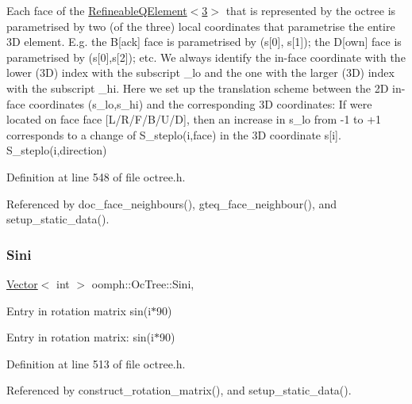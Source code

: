 Each face of the \hyperlink{classoomph_1_1RefineableQElement_3_013_01_4}{Refineable\+Q\+Element$<$3$>$} that is represented by the octree is parametrised by two (of the three) local coordinates that parametrise the entire 3D element. E.\+g. the B\mbox{[}ack\mbox{]} face is parametrised by (s\mbox{[}0\mbox{]}, s\mbox{[}1\mbox{]}); the D\mbox{[}own\mbox{]} face is parametrised by (s\mbox{[}0\mbox{]},s\mbox{[}2\mbox{]}); etc. We always identify the in-\/face coordinate with the lower (3D) index with the subscript {\ttfamily \+\_\+lo} and the one with the larger (3D) index with the subscript {\ttfamily \+\_\+hi}. Here we set up the translation scheme between the 2D in-\/face coordinates (s\+\_\+lo,s\+\_\+hi) and the corresponding 3D coordinates\+: If we\textquotesingle{}re located on face {\ttfamily face} \mbox{[}L/\+R/\+F/\+B/\+U/D\mbox{]}, then an increase in s\+\_\+lo from -\/1 to +1 corresponds to a change of {\ttfamily S\+\_\+steplo(i,face)} in the 3D coordinate {\ttfamily s}\mbox{[}i\mbox{]}. S\+\_\+steplo(i,direction) 

Definition at line 548 of file octree.\+h.



Referenced by doc\+\_\+face\+\_\+neighbours(), gteq\+\_\+face\+\_\+neighbour(), and setup\+\_\+static\+\_\+data().

\mbox{\label{classoomph_1_1OcTree_a5537d73ec80462fe6f03bdfd5ac836ff}} 
\subsubsection{\texorpdfstring{Sini}{Sini}}
{\footnotesize\ttfamily \hyperlink{classoomph_1_1Vector}{Vector}$<$ int $>$ oomph\+::\+Oc\+Tree\+::\+Sini\hspace{0.3cm}{\ttfamily [static]}, {\ttfamily [private]}}



Entry in rotation matrix sin(i$\ast$90) 

Entry in rotation matrix\+: sin(i$\ast$90) 

Definition at line 513 of file octree.\+h.



Referenced by construct\+\_\+rotation\+\_\+matrix(), and setup\+\_\+static\+\_\+data().

\mbox{\label{classoomph_1_1OcTree_addaa397d11580ec949531c8ae9b082a5}} 

